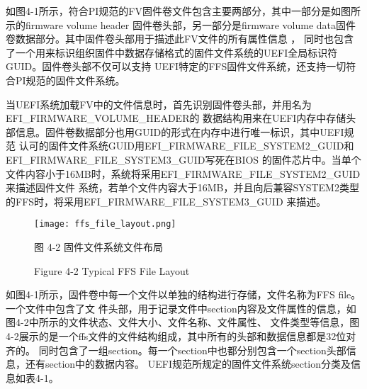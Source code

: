 如图4-1所示，符合PI规范的FV固件卷文件包含主要两部分，其中一部分是如图所示的firmware volume header
固件卷头部，另一部分是firmware volume data固件卷数据部分。其中固件卷头部用于描述此FV文件的所有属性信息
\cite{extra2}，
同时也包含了一个用来标识组织固件中数据存储格式的固件文件系统的UEFI全局标识符GUID。固件卷头部不仅可以支持
UEFI特定的FFS固件文件系统，还支持一切符合PI规范的固件文件系统。
\par 当UEFI系统加载FV中的文件信息时，首先识别固件卷头部，并用名为EFI\_FIRMWARE\_VOLUME\_HEADER的
数据结构用来在UEFI内存中存储头部信息。固件卷数据部分也用GUID的形式在内存中进行唯一标识，其中UEFI规范
认可的固件文件系统GUID用EFI\_FIRMWARE\_FILE\_SYSTEM2\_GUID和EFI\_FIRMWARE\_FILE\_SYSTEM3\_GUID写死在BIOS
的固件芯片中。当单个文件内容小于16MB时，系统将采用EFI\_FIRMWARE\_FILE\_SYSTEM2\_GUID来描述固件文件
系统，若单个文件内容大于16MB，并且向后兼容SYSTEM2类型的FFS时，将采用EFI\_FIRMWARE\_FILE\_SYSTEM3\_GUID
来描述。

\begin{figure}[htb]
    \label{ffs_format}
    \vspace{0cm}   
    \setlength{\abovecaptionskip}{0.3cm}
	\centering
    \texttt{[image: ffs\_file\_layout.png]}
    \caption*{图 4-2 固件文件系统文件布局}
    \setlength{\belowcaptionskip}{-0.7cm}
    \caption*{Figure 4-2 Typical FFS File Layout}
\end{figure}

\par 如图4-1所示，固件卷中每一个文件以单独的结构进行存储，文件名称为FFS file。一个文件中包含了文
件头部，用于记录文件中section内容及文件属性的信息，如图4-2中所示的文件状态、文件大小、文件名称、文件属性、
文件类型等信息，图4-2展示的是一个ffs文件的文件结构组成，其中所有的头部和数据信息都是32位对齐的。
同时包含了一组section。每一个section中也都分别包含一个section头部信息，还有section中的数据内容。
UEFI规范所规定的固件文件系统section分类及信息如表4-1。

